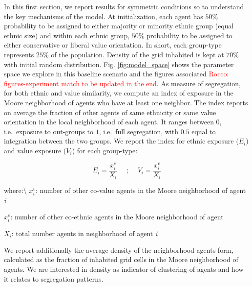 \documentclass[
]{article}
\begin{document}
In this first section, we report results for symmetric conditions so to
understand the key mechanisms of the model. At initialization, each
agent has \(50\%\) probability to be assigned to either majority or
minority ethnic group (equal ethnic size) and within each ethnic group,
\(50\%\) probability to be assigned to either conservative or liberal
value orientation. In short, each group-type represents \(25\%\) of the
population. Density of the grid inhabited is kept at \(70\%\) with
initial random distribution. Fig. \ref{fig:model_space} shows the
parameter space we explore in this baseline scenario and the figures
associated
{\textcolor{red}{Rocco: figures-experiment match to be updated in the end}}.
As measure of segregation, for both ethnic and value similarity, we
compute an index of exposure in the Moore neighborhood of agents who
have at least one neighbor. The index reports on average the fraction of
other agents of same ethnicity or same value orientation in the local
neighborhood of each agent. It ranges between \(0\), i.e.~exposure to
out-groups to \(1\), i.e.~full segregation, with \(0.5\) equal to
integration between the two groups. We report the index for ethnic
exposure (\(E_i\)) and value exposure (\(V_i\)) for each group-type:

\begin{equation}
   E_i = \frac{x^e_i}{X_i}\quad\text{   ;    }\quad  V_i = \frac{x^v_i}{X_i}
\end{equation}

where:\textbackslash{} \(x^v_i\): number of other co-value agents in the
Moore neighborhood of agent \textit{i}

\par

\(x^e_i\): number of other co-ethnic agents in the Moore neighborhood of
agent 

\par

\(X_i\): total number agents in neighborhood of agent \textit{i}

\par
\par

We report additionally the average density of the neighborhood agents
form, calculated as the fraction of inhabited grid cells in the Moore
neighborhood of agents. We are interested in density as indicator of
clustering of agents and how it relates to segregation patterns.
\end{document}
